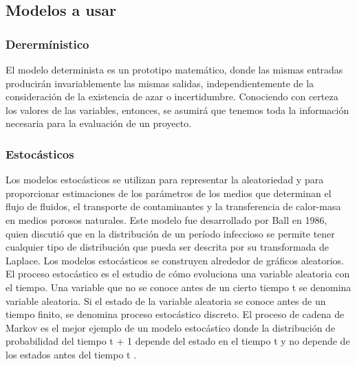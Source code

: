 \documentclass[11pt, letterpaper, spanish]{article}
\begin{document}
{\subsection{Modelos a usar}
\subsubsection{Derermínistico}
\par{El modelo determinista es un prototipo matemático, donde las mismas entradas producirán invariablemente las mismas salidas, independientemente de la consideración de la existencia de azar o incertidumbre. Conociendo con certeza los valores de las variables, entonces, se asumirá que tenemos toda la información necesaria para la evaluación de un proyecto\cite{ramos_2019}.}
\subsubsection{Estocásticos}
\par{Los modelos estocásticos se utilizan para representar la aleatoriedad y para proporcionar estimaciones de los parámetros de los medios que determinan el flujo de fluidos, el transporte de contaminantes y la transferencia de calor-masa en medios porosos naturales. Este modelo fue desarrollado por Ball en 1986, quien discutió que en la distribución de un período infeccioso se permite tener cualquier tipo de distribución que pueda ser descrita por su transformada de Laplace. Los modelos estocásticos se construyen alrededor de gráficos aleatorios. El proceso estocástico es el estudio de cómo evoluciona una variable aleatoria con el tiempo. Una variable que no se conoce antes de un cierto tiempo t se denomina variable aleatoria. Si el estado de la variable aleatoria se conoce antes de un tiempo finito, se denomina proceso estocástico discreto. El proceso de cadena de Markov es el mejor ejemplo de un modelo estocástico donde la distribución de probabilidad del tiempo t + 1 depende del estado en el tiempo t y no depende de los estados antes del tiempo t \cite{statistical_models_2003}.}
}
\end{document}
